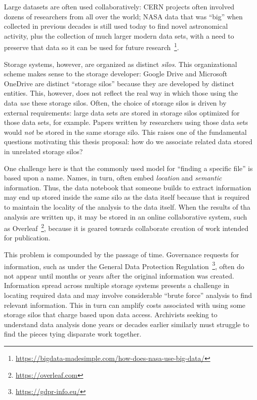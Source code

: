 Large datasets are often used collaboratively: CERN projects often involved
dozens of researchers from all over the world; NASA data that was ``big'' when
collected in previous decades is still used today to find novel astronomical
activity, plus the collection of much larger modern data sets, with a need
to preserve that data so it can be used for future
research~\footnote{\url{https://bigdata-madesimple.com/how-does-nasa-use-big-data/}}.

Storage systems, however, are organized as distinct \textit{silos}.  This
organizational scheme makes sense to the storage developer: Google Drive and
Microsoft OneDrive are distinct ``storage silos'' because they are developed by
distinct entities.  This, however, does not reflect the real way in which those
using the data \emph{use} these storage silos.  Often, the choice of storage
silos is driven by external requirements: large data sets are stored in storage
silos optimized for those data sets, for example. Papers written by researchers
using those data sets would \textit{not} be stored in the same storage silo.
This raises one of the fundamental questions motivating this thesis proposal:
how do we associate related data stored in unrelated storage silos?

One challenge here is that the commonly used model for ``finding a specific
file'' is based upon a name. Names, in turn, often embed \emph{location}
and \emph{semantic} information.  Thus, the data notebook that someone builds to
extract information may end up stored inside the same silo as the data itself
because that is required to maintain the locality of the analysis to the data
itself.  When the results of tha analysis are written up, it may be stored in an
online collaborative system, such as
Overleaf~\footnote{\url{https://overleaf.com}}, because it is geared towards
collaborate creation of work intended for publication.

This problem is compounded by the passage of time.  Governance requests for
information, such as under the General Data Protection
Regulation~\footnote{\url{https://gdpr-info.eu/}}, often do not appear until
months or years after the original information was created.  Information spread
across multiple storage systems presents a challenge in locating required data
and may involve considerable ``brute force'' analysis to find relevant
information.  This in turn can amplify costs associated with using some storage
silos that charge based upon data access.  Archivists seeking to understand data
analysis done years or decades earlier similarly must struggle to find the
pieces tying disparate work together.

